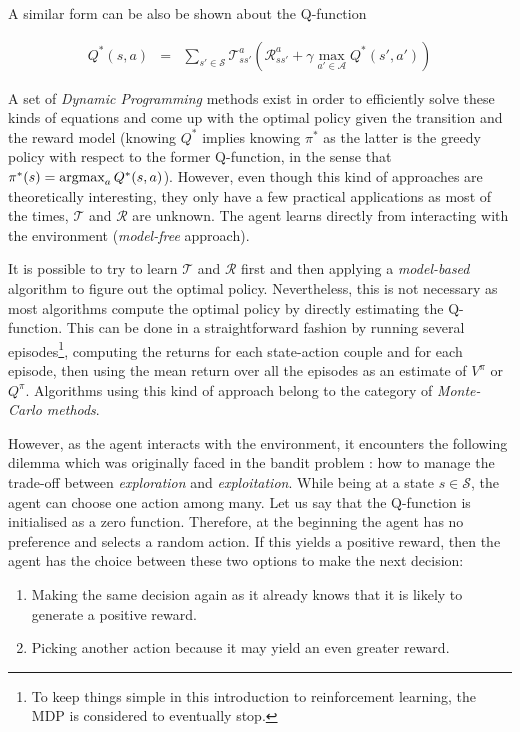 			A similar form can be also be shown about the Q-function
							
				\begin{eqnarray}
					Q^*(s,a) & = & \sum_{s' \in \mathcal{S}} \mathscr{T}_{ss'}^a (\mathscr{R}_{ss'}^a + \gamma \max_{a' \in \mathcal{A}} Q^*(s',a')) \label{eq:qbellmanoptim}
				\end{eqnarray}

			A set of \textit{Dynamic Programming} methods exist in order to efficiently solve these kinds of equations and come up with the optimal policy given the transition and the reward model (knowing $Q^*$ implies knowing $\pi^*$ as the latter is the greedy policy with respect to the former Q-function, in the sense that $\pi^*(s) = \mathop{\hbox{argmax}}_a Q^*(s,a)$). However, even though this kind of approaches are theoretically interesting, they only have a few practical applications as most of the times, $\mathscr{T}$ and $\mathscr{R}$ are unknown. The agent learns directly from interacting with the environment (\textit{model-free} approach).
			
			It is possible to try to learn $\mathscr{T}$ and $\mathscr{R}$ first and then applying a \textit{model-based} algorithm to figure out the optimal policy. Nevertheless, this is not necessary as most algorithms compute the optimal policy by directly estimating the Q-function. This can be done in a straightforward fashion by running several episodes\footnote{To keep things simple in this introduction to reinforcement learning, the MDP is considered to eventually stop.}, computing the returns for each state-action couple and for each episode, then using the mean return over all the episodes as an estimate of $V^\pi$ or $Q^\pi$. Algorithms using this kind of approach belong to the category of \textit{Monte-Carlo methods}.
			
			However, as the agent interacts with the environment, it encounters the following dilemma which was originally faced in the bandit problem \cite{Berry1985,Bubeck2012}: how to manage the trade-off between \textit{exploration} and \textit{exploitation}. While being at a state $s \in \mathcal{S}$, the agent can choose one action among many. Let us say that the Q-function is initialised as a zero function. Therefore, at the beginning the agent has no preference and selects a random action. If this yields a positive reward, then the agent has the choice between these two options to make the next decision:
			
			\begin{enumerate}
				\item Making the same decision again as it already knows that it is likely to generate a positive reward.
				\item Picking another action because it may yield an even greater reward.
			\end{enumerate}
			
